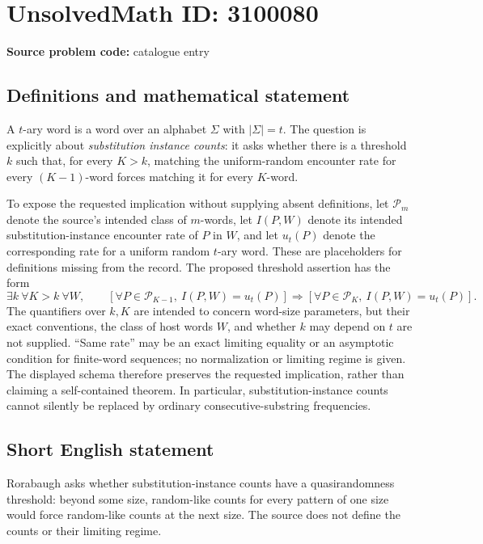 \documentclass[11pt]{article}
\begin{document}
\section*{UnsolvedMath ID: 3100080}
\textbf{Source problem code:} catalogue entry
\subsection{Definitions and mathematical statement}
A $t$-ary word is a word over an alphabet $\Sigma$ with $|\Sigma|=t$. The question is explicitly about \emph{substitution instance counts}: it asks whether there is a threshold $k$ such that, for every $K>k$, matching the uniform-random encounter rate for every $(K-1)$-word forces matching it for every $K$-word.

To expose the requested implication without supplying absent definitions, let $\mathcal P_m$ denote the source's intended class of $m$-words, let $I(P,W)$ denote its intended substitution-instance encounter rate of $P$ in $W$, and let $u_t(P)$ denote the corresponding rate for a uniform random $t$-ary word. These are placeholders for definitions missing from the record. The proposed threshold assertion has the form
\[
\exists k\ \forall K>k\ \forall W,\qquad
\left[\forall P\in\mathcal P_{K-1},\ I(P,W)=u_t(P)\right]
\Longrightarrow
\left[\forall P\in\mathcal P_K,\ I(P,W)=u_t(P)\right].
\]
The quantifiers over $k,K$ are intended to concern word-size parameters, but their exact conventions, the class of host words $W$, and whether $k$ may depend on $t$ are not supplied. ``Same rate'' may be an exact limiting equality or an asymptotic condition for finite-word sequences; no normalization or limiting regime is given. The displayed schema therefore preserves the requested implication, rather than claiming a self-contained theorem. In particular, substitution-instance counts cannot silently be replaced by ordinary consecutive-substring frequencies.
\subsection{Short English statement}
Rorabaugh asks whether substitution-instance counts have a quasirandomness threshold: beyond some size, random-like counts for every pattern of one size would force random-like counts at the next size. The source does not define the counts or their limiting regime.
\end{document}
